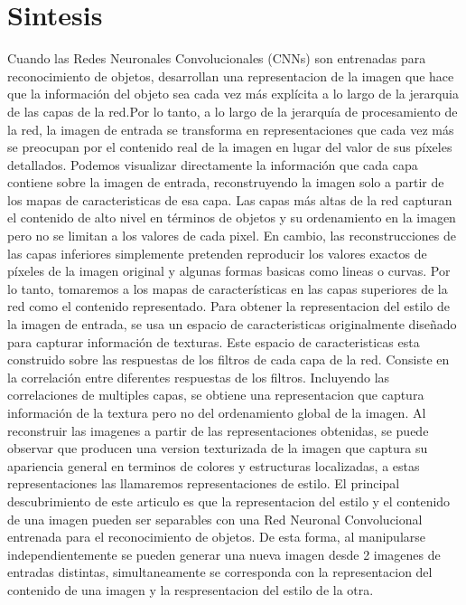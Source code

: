 \documentclass[a4paper,11pt,spanish]{book}
\begin{document}
    \section{Sintesis}
      Cuando las Redes Neuronales Convolucionales (CNNs) son entrenadas para reconocimiento de objetos, desarrollan una representacion de la imagen que hace que la información 
      del objeto sea cada vez más explícita a lo largo de la jerarquia de las capas de la red.Por lo tanto, a lo largo de la jerarquía de procesamiento de la red, 
      la imagen de entrada se transforma en representaciones que cada vez más se preocupan por el contenido real de la imagen en lugar del valor de sus píxeles detallados. 
      Podemos visualizar directamente la información que cada capa contiene sobre la imagen de entrada, reconstruyendo la imagen solo a partir de los mapas de caracteristicas
      de esa capa. Las capas más altas de la red capturan el contenido de alto nivel en términos de objetos y su ordenamiento en la imagen pero no se limitan a los valores de cada 
      pixel. En  cambio, las reconstrucciones de las capas inferiores simplemente pretenden reproducir los valores exactos de píxeles de la imagen original y algunas formas
      basicas como lineas o curvas. Por lo tanto, tomaremos a los mapas de características en las capas superiores de la red como el contenido representado.
      Para obtener la representacion del estilo de la imagen de entrada, se usa un espacio de caracteristicas originalmente diseñado para capturar información de texturas.
      Este espacio de caracteristicas esta construido sobre las respuestas de los filtros de cada capa de la red. Consiste en la correlación entre diferentes respuestas de los filtros.
      Incluyendo las correlaciones de multiples capas, se obtiene una representacion que captura información de la textura pero no del ordenamiento global de la imagen.
      Al reconstruir las imagenes a partir de las representaciones obtenidas, se puede observar que producen una version texturizada de la imagen que captura su 
      apariencia general en terminos de colores y estructuras localizadas, a estas representaciones las llamaremos representaciones de estilo.
      El principal descubrimiento de este articulo es que la representacion del estilo y el contenido de una imagen pueden ser separables con una Red Neuronal Convolucional entrenada 
      para el reconocimiento de objetos. De esta forma, al manipularse independientemente se pueden generar una nueva imagen desde 2 imagenes de entradas distintas, simultaneamente se corresponda con la representacion
      del contenido de una imagen y la respresentacion del estilo de la otra.
\end{document}
